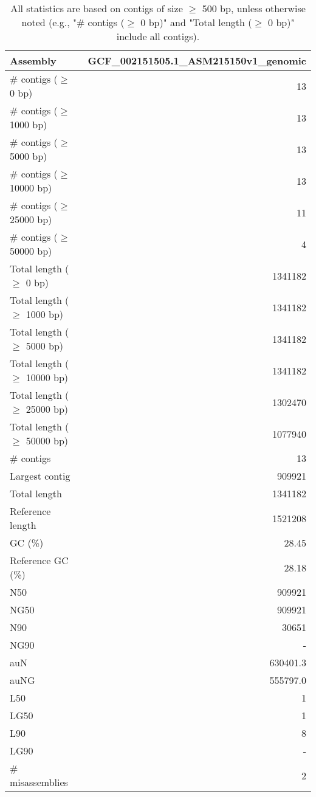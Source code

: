 \documentclass[12pt,a4paper]{article}
\begin{document}
\begin{table}[ht]
\begin{center}
\caption{All statistics are based on contigs of size $\geq$ 500 bp, unless otherwise noted (e.g., "\# contigs ($\geq$ 0 bp)" and "Total length ($\geq$ 0 bp)" include all contigs).}
\begin{tabular}{|l*{1}{|r}|}
\hline
Assembly & GCF\_002151505.1\_ASM215150v1\_genomic \\ \hline
\# contigs ($\geq$ 0 bp) & 13 \\ \hline
\# contigs ($\geq$ 1000 bp) & 13 \\ \hline
\# contigs ($\geq$ 5000 bp) & 13 \\ \hline
\# contigs ($\geq$ 10000 bp) & 13 \\ \hline
\# contigs ($\geq$ 25000 bp) & 11 \\ \hline
\# contigs ($\geq$ 50000 bp) & 4 \\ \hline
Total length ($\geq$ 0 bp) & 1341182 \\ \hline
Total length ($\geq$ 1000 bp) & 1341182 \\ \hline
Total length ($\geq$ 5000 bp) & 1341182 \\ \hline
Total length ($\geq$ 10000 bp) & 1341182 \\ \hline
Total length ($\geq$ 25000 bp) & 1302470 \\ \hline
Total length ($\geq$ 50000 bp) & 1077940 \\ \hline
\# contigs & 13 \\ \hline
Largest contig & 909921 \\ \hline
Total length & 1341182 \\ \hline
Reference length & 1521208 \\ \hline
GC (\%) & 28.45 \\ \hline
Reference GC (\%) & 28.18 \\ \hline
N50 & 909921 \\ \hline
NG50 & 909921 \\ \hline
N90 & 30651 \\ \hline
NG90 & - \\ \hline
auN & 630401.3 \\ \hline
auNG & 555797.0 \\ \hline
L50 & 1 \\ \hline
LG50 & 1 \\ \hline
L90 & 8 \\ \hline
LG90 & - \\ \hline
\# misassemblies & 2 \\ \hline

\end{tabular}
\end{center}
\end{table}
\end{document}
